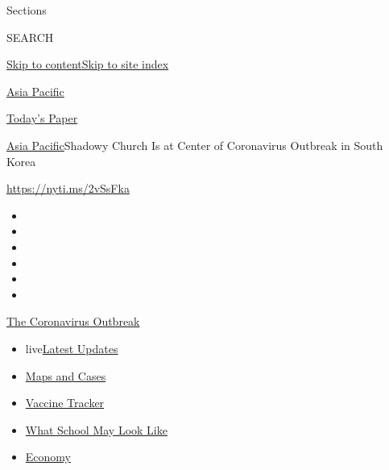 Sections

SEARCH

\protect\hyperlink{site-content}{Skip to
content}\protect\hyperlink{site-index}{Skip to site index}

\href{https://www.nytimes.com/section/world/asia}{Asia Pacific}

\href{https://myaccount.nytimes.com/auth/login?response_type=cookie\&client_id=vi}{}

\href{https://www.nytimes.com/section/todayspaper}{Today's Paper}

\href{/section/world/asia}{Asia Pacific}\textbar{}Shadowy Church Is at
Center of Coronavirus Outbreak in South Korea

\url{https://nyti.ms/2vSsFka}

\begin{itemize}
\item
\item
\item
\item
\item
\item
\end{itemize}

\href{https://www.nytimes.com/news-event/coronavirus?action=click\&pgtype=Article\&state=default\&region=TOP_BANNER\&context=storylines_menu}{The
Coronavirus Outbreak}

\begin{itemize}
\tightlist
\item
  live\href{https://www.nytimes.com/2020/08/02/world/coronavirus-updates.html?action=click\&pgtype=Article\&state=default\&region=TOP_BANNER\&context=storylines_menu}{Latest
  Updates}
\item
  \href{https://www.nytimes.com/interactive/2020/us/coronavirus-us-cases.html?action=click\&pgtype=Article\&state=default\&region=TOP_BANNER\&context=storylines_menu}{Maps
  and Cases}
\item
  \href{https://www.nytimes.com/interactive/2020/science/coronavirus-vaccine-tracker.html?action=click\&pgtype=Article\&state=default\&region=TOP_BANNER\&context=storylines_menu}{Vaccine
  Tracker}
\item
  \href{https://www.nytimes.com/interactive/2020/07/29/us/schools-reopening-coronavirus.html?action=click\&pgtype=Article\&state=default\&region=TOP_BANNER\&context=storylines_menu}{What
  School May Look Like}
\item
  \href{https://www.nytimes.com/live/2020/07/31/business/stock-market-today-coronavirus?action=click\&pgtype=Article\&state=default\&region=TOP_BANNER\&context=storylines_menu}{Economy}
\end{itemize}

